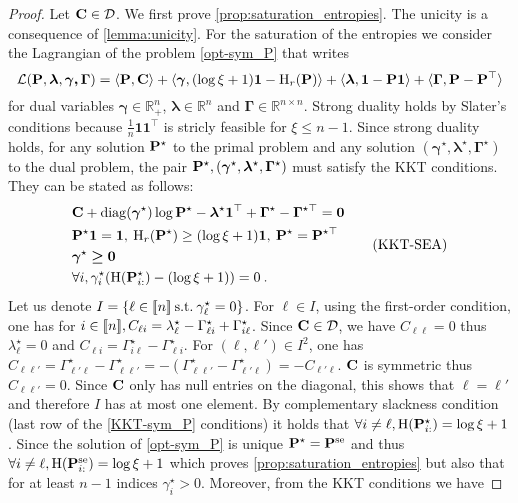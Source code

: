 \begin{proof}
Let $\mathbf{C} \in \mathcal{D}$. We first prove \cref{prop:saturation_entropies}. The unicity is a consequence of \cref{lemma:unicity}. For the saturation of the entropies we consider the Lagrangian of the problem \eqref{opt-sym_P} that writes $$\mathcal{L}(\mathbf{P}, \bm{\lambda}, \bm{\gamma, \bm{\Gamma}}) = \langle \mathbf{P}, \mathbf{C} \rangle + \langle \bm{\gamma}, (\log{\xi}+1) \bm{1} - \operatorname{H}_r(\mathbf{P}) \rangle + \langle \bm{\lambda}, \bm{1} - \mathbf{P} \bm{1} \rangle + \langle \bm{\Gamma}, \mathbf{P} - \mathbf{P}^\top \rangle$$ for dual variables $\bm{\gamma} \in \mathbb{R}_+^n$, $\bm{\lambda} \in \mathbb{R}^n$ and $\bm{\Gamma} \in \mathbb{R}^{n \times n}$. Strong duality holds by Slater's conditions because $\frac{1}{n} \bm{1} \bm{1}^{\top}$ is stricly feasible for $\xi \leq n-1$. Since strong duality holds, for any solution $\mathbf{P}^\star$ to the primal problem and any solution $(\bm{\gamma}^\star, \bm{\lambda}^\star, \bm{\Gamma}^\star)$ to the dual problem, the pair $\mathbf{P}^\star, (\bm{\gamma}^\star, \bm{\lambda}^\star, \bm{\Gamma}^\star)$ must satisfy the KKT conditions. They can be stated as follows:
\begin{equation}
    \begin{aligned}
    &\mathbf{C} + \operatorname{diag}(\bm{\gamma}^\star)\log{\mathbf{P}^\star} - \bm{\lambda}^\star \bm{1}^\top + \bm{\Gamma}^\star - \bm{\Gamma}^{\star\top} = \bm{0} \\
    &\mathbf{P}^\star \bm{1} = \bm{1}, \: \operatorname{H}_r(\mathbf{P}^\star) \geq (\log{\xi} + 1)\bm{1}, \: \mathbf{P}^\star = \mathbf{P}^{\star \top} \\
    &\bm{\gamma}^\star \bm{\geq} \bm{0} \\
    &\forall i, \gamma_i^\star (\operatorname{H}(\mathbf{P}_{i:}^\star) - (\log{\xi} + 1)) = 0\:.
\end{aligned}
\tag{KKT-SEA}\label{KKT-sym_P}
\end{equation}
Let us denote $I = \{\ell \in {[\![n]\!]} \: \text{s.t.} \: \gamma_\ell^\star = 0\}$. For $\ell \in I$, using the first-order condition, one has for $i \in {[\![n]\!]}, C_{\ell i} = \lambda^\star_\ell - \Gamma^\star_{\ell i} + \Gamma^{\star}_{i \ell}$. Since $\mathbf{C} \in \mathcal{D}$, we have $C_{\ell \ell} = 0$ thus $\lambda^\star_\ell = 0$ and $C_{\ell i} = \Gamma^\star_{i \ell} - \Gamma^{\star}_{\ell i}$.
For $(\ell, \ell') \in I^2$, one has $C_{\ell \ell'} = \Gamma^\star_{\ell' \ell} - \Gamma^{\star}_{\ell \ell'} = - (\Gamma^{\star}_{\ell \ell'} - \Gamma^\star_{\ell' \ell}) = - C_{\ell' \ell}$. $\mathbf{C}$ is symmetric thus $C_{\ell \ell'}=0$. Since $\mathbf{C}$ only has null entries on the diagonal, this shows that $\ell = \ell'$ and therefore $I$ has at most one element. By complementary slackness condition (last row of the \ref{KKT-sym_P} conditions) it holds that $\forall i \neq \ell, \operatorname{H}(\mathbf{P}^{\star}_{i:}) = \log \xi + 1$. Since the solution of \eqref{opt-sym_P} is unique $\mathbf{P}^\star = \mathbf{P}^{\mathrm{se}}$ and thus $\forall i \neq \ell, \operatorname{H}(\mathbf{P}^{\mathrm{se}}_{i:}) = \log \xi + 1$ which proves \cref{prop:saturation_entropies} but also that for at least $n-1$ indices $\gamma_i^\star > 0$. Moreover, from the KKT conditions we have

\end{proof}
